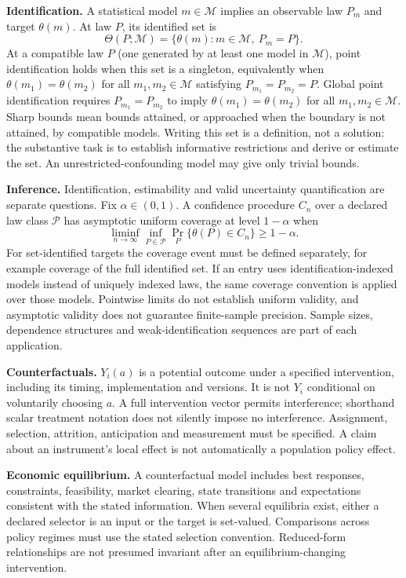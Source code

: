 \documentclass[11pt,a4paper]{article}
\begin{document}
\textbf{Identification.} A statistical model $m\in\mathcal M$ implies an observable law $P_m$ and target $\theta(m)$. At law $P$, its identified set is
\[
\Theta(P;\mathcal M)=\{\theta(m):m\in\mathcal M,\ P_m=P\}.
\]
At a compatible law $P$ (one generated by at least one model in $\mathcal M$), point identification holds when this set is a singleton, equivalently when $\theta(m_1)=\theta(m_2)$ for all $m_1,m_2\in\mathcal M$ satisfying $P_{m_1}=P_{m_2}=P$. Global point identification requires $P_{m_1}=P_{m_2}$ to imply $\theta(m_1)=\theta(m_2)$ for all $m_1,m_2\in\mathcal M$. Sharp bounds mean bounds attained, or approached when the boundary is not attained, by compatible models. Writing this set is a definition, not a solution: the substantive task is to establish informative restrictions and derive or estimate the set. An unrestricted-confounding model may give only trivial bounds.

\textbf{Inference.} Identification, estimability and valid uncertainty quantification are separate questions. Fix $\alpha\in(0,1)$. A confidence procedure $C_n$ over a declared law class $\mathcal P$ has asymptotic uniform coverage at level $1-\alpha$ when
\[
\liminf_{n\to\infty}\inf_{P\in\mathcal P}\Pr_P\{\theta(P)\in C_n\}\geq1-\alpha.
\]
For set-identified targets the coverage event must be defined separately, for example coverage of the full identified set. If an entry uses identification-indexed models instead of uniquely indexed laws, the same coverage convention is applied over those models. Pointwise limits do not establish uniform validity, and asymptotic validity does not guarantee finite-sample precision. Sample sizes, dependence structures and weak-identification sequences are part of each application.

\textbf{Counterfactuals.} $Y_i(a)$ is a potential outcome under a specified intervention, including its timing, implementation and versions. It is not $Y_i$ conditional on voluntarily choosing $a$. A full intervention vector permits interference; shorthand scalar treatment notation does not silently impose no interference. Assignment, selection, attrition, anticipation and measurement must be specified. A claim about an instrument's local effect is not automatically a population policy effect.

\textbf{Economic equilibrium.} A counterfactual model includes best responses, constraints, feasibility, market clearing, state transitions and expectations consistent with the stated information. When several equilibria exist, either a declared selector is an input or the target is set-valued. Comparisons across policy regimes must use the stated selection convention. Reduced-form relationships are not presumed invariant after an equilibrium-changing intervention.
\end{document}
